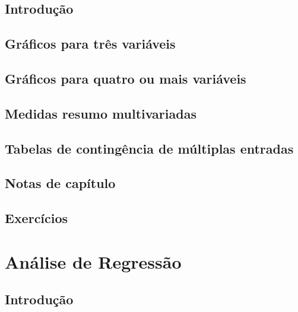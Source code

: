 \documentclass[
]{latex/krantz}
\theoremstyle{definition}
\theoremstyle{definition}
\theoremstyle{definition}
\theoremstyle{definition}
\theoremstyle{remark}
\begin{document}
\hypertarget{introduuxe7uxe3o-3}{%
\section{Introdução}\label{introduuxe7uxe3o-3}}

\hypertarget{gruxe1ficos-para-truxeas-variuxe1veis}{%
\section{Gráficos para três variáveis}\label{gruxe1ficos-para-truxeas-variuxe1veis}}

\hypertarget{gruxe1ficos-para-quatro-ou-mais-variuxe1veis}{%
\section{Gráficos para quatro ou mais variáveis}\label{gruxe1ficos-para-quatro-ou-mais-variuxe1veis}}

\hypertarget{medidas-resumo-multivariadas}{%
\section{Medidas resumo multivariadas}\label{medidas-resumo-multivariadas}}

\hypertarget{tabelas-de-continguxeancia-de-muxfaltiplas-entradas}{%
\section{Tabelas de contingência de múltiplas entradas}\label{tabelas-de-continguxeancia-de-muxfaltiplas-entradas}}

\hypertarget{notas-de-capuxedtulo-3}{%
\section{Notas de capítulo}\label{notas-de-capuxedtulo-3}}

\hypertarget{exercuxedcios-3}{%
\section{Exercícios}\label{exercuxedcios-3}}

\hypertarget{anuxe1lise-de-regressuxe3o}{%
\chapter{Análise de Regressão}\label{anuxe1lise-de-regressuxe3o}}

\hypertarget{introduuxe7uxe3o-4}{%
\section{Introdução}\label{introduuxe7uxe3o-4}}
\end{document}
